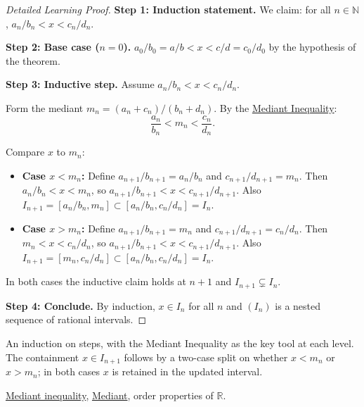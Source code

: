 \begin{proof}[Detailed Learning Proof]
\LRAProofBodyStart
\textbf{Step 1: Induction statement.}
We claim: for all $n \in \mathbb{N}$, $a_n/b_n < x < c_n/d_n$.

\textbf{Step 2: Base case ($n = 0$).}
$a_0/b_0 = a/b < x < c/d = c_0/d_0$ by the hypothesis of the theorem.

\textbf{Step 3: Inductive step.}
Assume $a_n/b_n < x < c_n/d_n$.

Form the mediant $m_n = (a_n + c_n)/(b_n + d_n)$.  By the
\hyperref[thm:mediant-inequality]{Mediant Inequality}:
\[
\frac{a_n}{b_n} < m_n < \frac{c_n}{d_n}.
\]

Compare $x$ to $m_n$:
\begin{itemize}
  \item \textbf{Case $x < m_n$:} Define $a_{n+1}/b_{n+1} = a_n/b_n$ and
        $c_{n+1}/d_{n+1} = m_n$.  Then $a_n/b_n < x < m_n$, so
        $a_{n+1}/b_{n+1} < x < c_{n+1}/d_{n+1}$.  Also
        $I_{n+1} = [a_n/b_n, m_n] \subset [a_n/b_n, c_n/d_n] = I_n$.
  \item \textbf{Case $x > m_n$:} Define $a_{n+1}/b_{n+1} = m_n$ and
        $c_{n+1}/d_{n+1} = c_n/d_n$.  Then $m_n < x < c_n/d_n$, so
        $a_{n+1}/b_{n+1} < x < c_{n+1}/d_{n+1}$.  Also
        $I_{n+1} = [m_n, c_n/d_n] \subset [a_n/b_n, c_n/d_n] = I_n$.
\end{itemize}
In both cases the inductive claim holds at $n+1$ and $I_{n+1} \subsetneq I_n$.

\textbf{Step 4: Conclude.}
By induction, $x \in I_n$ for all $n$ and $(I_n)$ is a nested sequence of
rational intervals.
\end{proof}

\begin{remark*}
An induction on steps, with the Mediant Inequality as the key tool at each
level.  The containment $x \in I_{n+1}$ follows by a two-case split on
whether $x < m_n$ or $x > m_n$; in both cases $x$ is retained in the
updated interval.
\end{remark*}

\begin{dependencies}
\hyperref[thm:mediant-inequality]{Mediant inequality},
\hyperref[def:mediant]{Mediant},
order properties of $\mathbb{R}$.
\end{dependencies}

\clearpage
